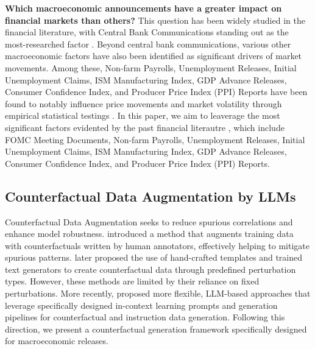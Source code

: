 \textbf{Which macroeconomic announcements have a greater impact on financial markets than others?} This question has been widely studied in the financial literature, with Central Bank Communications standing out as the most-researched factor \cite{https://doi.org/10.1111/jofi.12818,GERTLER2018336,https://doi.org/10.1111/joes.12550,RePEc:ijc:ijcjou:y:2016:q:4:a:6,TADLE2022106021,RePEc:fip:fednep:00004,https://doi.org/10.1111/jofi.12196,ROSA2011915}. Beyond central bank communications, various other macroeconomic factors have also been identified as significant drivers of market movements. Among these, Non-farm Payrolls, Unemployment Releases, Initial Unemployment Claims, ISM Manufacturing Index, GDP Advance Releases, Consumer Confidence Index, and Producer Price Index (PPI) Reports have been found to notably influence price movements and market volatility through empirical statistical testings \cite{NBERw1296,Gilbert2010-dt,GILBERT201778,RePEc:fip:fednci:y:2008:i:aug:n:v.14no.6,9fdfa12d09ae4792a11e8360a71a356a,RePEc:snb:snbwpa:2013-11}. In this paper, we aim to leaverage the most significant factors evidented by the past financial literautre \cite{NBERw1296,Gilbert2010-dt,GILBERT201778,RePEc:fip:fednci:y:2008:i:aug:n:v.14no.6,9fdfa12d09ae4792a11e8360a71a356a,RePEc:snb:snbwpa:2013-11}, which include FOMC Meeting Documents, Non-farm Payrolls, Unemployment Releases, Initial Unemployment Claims, ISM Manufacturing Index, GDP Advance Releases, Consumer Confidence Index, and Producer Price Index (PPI) Reports.

\subsection{Counterfactual Data Augmentation by LLMs} 

Counterfactual Data Augmentation seeks to reduce spurious correlations and enhance model robustness. \citet{Kaushik2020Learning} introduced a method that augments training data with counterfactuals written by human annotators, effectively helping to mitigate spurious patterns. \citet{wu-etal-2021-polyjuice, ross-etal-2022-tailor} later proposed the use of hand-crafted templates and trained text generators to create counterfactual data through predefined perturbation types. However, these methods are limited by their reliance on fixed perturbations. More recently, \citet{chen-etal-2023-disco, wang-etal-2023-self-instruct} proposed more flexible, LLM-based approaches that leverage specifically designed in-context learning prompts and generation pipelines for counterfactual and instruction data generation. Following this direction, we present a counterfactual generation framework specifically designed for macroeconomic releases.






